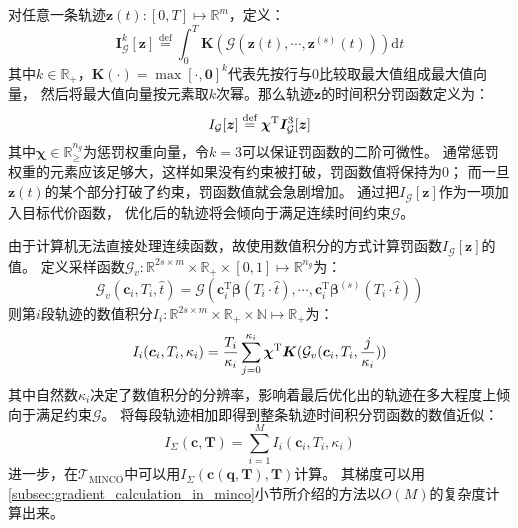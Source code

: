 对任意一条轨迹$\bm{z}(t):[0, T] \mapsto \mathbb{R}^m$，定义：
\begin{equation}
  \bm{I}_{\mathcal{G}}^k[\bm{z}] \overset{\text{def}}{=} 
  \int_0^T \bm{K}(\mathcal{G}(\bm{z}(t), \cdots, \bm{z}^{(s)}(t))) \text{d}t
  \label{equ:time_int_violation}
\end{equation}
其中$k\in\mathbb{R}_+$，$\bm{K}(\cdot)=\max[\cdot,\textbf{0}]^k$代表先按行与0比较取最大值组成最大值向量，
然后将最大值向量按元素取$k$次幂。那么轨迹$\bm{z}$的时间积分罚函数定义为：
\begin{equation}
  I_{\mathcal{G}}[\bm{z}] \overset{\text{def}}{=} 
  {\bm{\chi}}^{\text{T}}\bm{I}_{\mathcal{G}}^3[\bm{z}]
  \label{equ:form_of_tipf}
\end{equation}
其中$\bm{\chi}\in\mathbb{R}_{\geq}^{n_g}$为惩罚权重向量，令$k=3$可以保证罚函数的二阶可微性。
通常惩罚权重的元素应该足够大，这样如果没有约束被打破，罚函数值将保持为0；
而一旦$\bm{z}(t)$的某个部分打破了约束，罚函数值就会急剧增加。
通过把$I_{\mathcal{G}}[\bm{z}]$作为一项加入目标代价函数，
优化后的轨迹将会倾向于满足连续时间约束$\mathcal{G}$。

由于计算机无法直接处理连续函数，故使用数值积分的方式计算罚函数$I_{\mathcal{G}}[\bm{z}]$的值。
定义采样函数$\mathcal{G}_v:\mathbb{R}^{2s\times m}\times \mathbb{R}_+ \times [0,1] \mapsto \mathbb{R}^{n_g}$为：
\begin{equation}
  \mathcal{G}_v(\bm{c}_i, T_i, \hat{t}) = 
  \mathcal{G}\left( 
    \bm{c}_i^{\text{T}}\bm{\beta}(T_i\cdot \hat{t}), \cdots, \bm{c}_i^{\text{T}}\bm{\beta}^{(s)}(T_i\cdot \hat{t})
  \right)
  \label{equ:sample_function}
\end{equation}
则第$i$段轨迹的数值积分$I_i:\mathbb{R}^{2s\times m}\times \mathbb{R}_+ \times \mathbb{N} \mapsto \mathbb{R}_+$为：
\begin{equation}
  I_i(\bm{c}_i, T_i, \kappa_i) = \frac{T_i}{\kappa_i} \sum_{j=0}^{\kappa_i}{\bm{\chi}}^{\text{T}}\bm{K}(\mathcal{G}_v(\bm{c}_i, T_i, \frac{j}{\kappa_i}))
  \label{equ:numerical_approximation_of_tipf_of_ith_piece}
\end{equation}
其中自然数$\kappa_i$决定了数值积分的分辨率，影响着最后优化出的轨迹在多大程度上倾向于满足约束$\mathcal{G}$。
将每段轨迹相加即得到整条轨迹时间积分罚函数的数值近似：
\begin{equation}
  I_{\Sigma}(\bm{c}, \bm{T}) = \sum_{i=1}^M I_i(\bm{c}_i, T_i, \kappa_i)
  \label{equ:numerical_approximation_of_tipf_of_the_whole_traj}
\end{equation}
进一步，在$\mathcal{T}_{\text{MINCO}}$中可以用$I_{\Sigma}(\bm{c}(\bm{q}, \bm{T}), \bm{T})$计算。
其梯度可以用\ref{subsec:gradient_calculation_in_minco}小节所介绍的方法以$O(M)$的复杂度计算出来。

